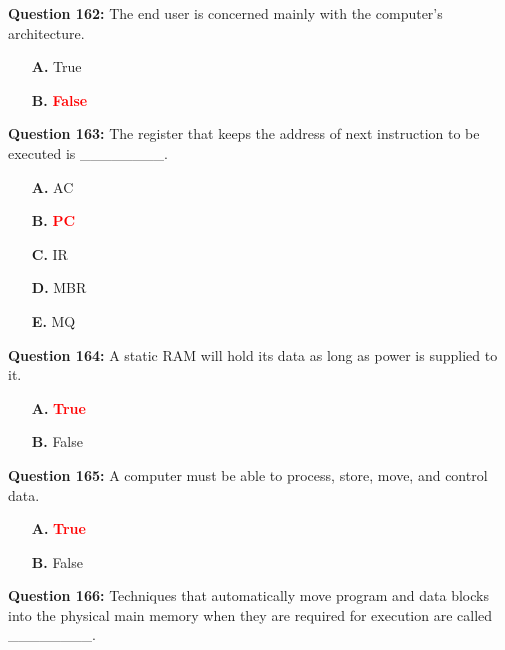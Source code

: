 \documentclass[12pt,a4paper]{article}
\begin{document}
\vspace{0.5cm}

\textbf{Question 162:} The end user is concerned mainly with the computer's architecture.

\begin{itemize}
    \item[\textbf{A.}] True
    \item[\textbf{B.}] \textcolor{red}{\textbf{False}}
\end{itemize}

\vspace{0.5cm}

\textbf{Question 163:} The register that keeps the address of next instruction to be executed is ________.

\begin{itemize}
    \item[\textbf{A.}] AC
    \item[\textbf{B.}] \textcolor{red}{\textbf{PC}}
    \item[\textbf{C.}] IR
    \item[\textbf{D.}] MBR
    \item[\textbf{E.}] MQ
\end{itemize}

\vspace{0.5cm}

\textbf{Question 164:} A static RAM will hold its data as long as power is supplied to it.

\begin{itemize}
    \item[\textbf{A.}] \textcolor{red}{\textbf{True}}
    \item[\textbf{B.}] False
\end{itemize}

\vspace{0.5cm}

\textbf{Question 165:} A computer must be able to process, store, move, and control data.

\begin{itemize}
    \item[\textbf{A.}] \textcolor{red}{\textbf{True}}
    \item[\textbf{B.}] False
\end{itemize}

\vspace{0.5cm}

\textbf{Question 166:} Techniques that automatically move program and data blocks into the physical main memory when they are required for execution are called ________.
\end{document}
